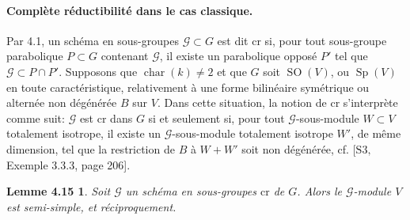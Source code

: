 \documentclass[11pt]{article}
\newtheorem*{lemme415}{Lemme 4.15}
\newcommand{\SO}{\operatorname{SO}}
\newcommand{\Sp}{\operatorname{Sp}}
\begin{document}
\paragraph{Complète réductibilité dans le cas classique.}
Par 4.1, un schéma en sous-groupes \(\mathcal G\subset G\) est dit \(\mathrm{cr}\) si,
pour tout sous-groupe parabolique \(P\subset G\) contenant \(\mathcal G\), il existe un
parabolique opposé \(P'\) tel que \(\mathcal G\subset P\cap P'\). Supposons que
\(\operatorname{char}(k)\ne2\) et que \(G\) soit \(\SO(V)\), ou \(\Sp(V)\) en toute
caractéristique, relativement à une forme bilinéaire symétrique ou alternée non dégénérée
\(B\) sur \(V\). Dans cette situation, la notion de \(\mathrm{cr}\) s'interprète comme
suit: \(\mathcal G\) est \(\mathrm{cr}\) dans \(G\) si et seulement si, pour tout
\(\mathcal G\)-sous-module \(W\subset V\) totalement isotrope, il existe un
\(\mathcal G\)-sous-module totalement isotrope \(W'\), de même dimension, tel que la
restriction de \(B\) à \(W+W'\) soit non dégénérée, cf. \([\mathrm{S3},\) Exemple 3.3.3,
page 206].

\begin{lemme415}
Soit \(\mathcal G\) un schéma en sous-groupes \(\mathrm{cr}\) de \(G\). Alors le
\(\mathcal G\)-module \(V\) est semi-simple, et réciproquement.
\end{lemme415}
\end{document}
